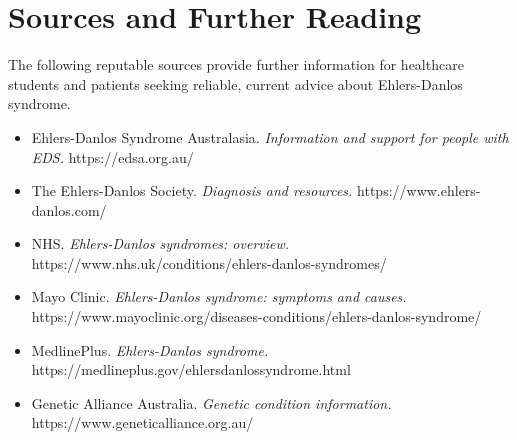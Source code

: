 \section*{Sources and Further Reading}
The following reputable sources provide further information for healthcare students and patients seeking reliable, current advice about Ehlers-Danlos syndrome.
\begin{itemize}
    \item Ehlers-Danlos Syndrome Australasia. \textit{Information and support for people with EDS.} https://edsa.org.au/
    \item The Ehlers-Danlos Society. \textit{Diagnosis and resources.} https://www.ehlers-danlos.com/
    \item NHS. \textit{Ehlers-Danlos syndromes: overview.} https://www.nhs.uk/conditions/ehlers-danlos-syndromes/
    \item Mayo Clinic. \textit{Ehlers-Danlos syndrome: symptoms and causes.} https://www.mayoclinic.org/diseases-conditions/ehlers-danlos-syndrome/
    \item MedlinePlus. \textit{Ehlers-Danlos syndrome.} https://medlineplus.gov/ehlersdanlossyndrome.html
    \item Genetic Alliance Australia. \textit{Genetic condition information.} https://www.geneticalliance.org.au/
\end{itemize}
